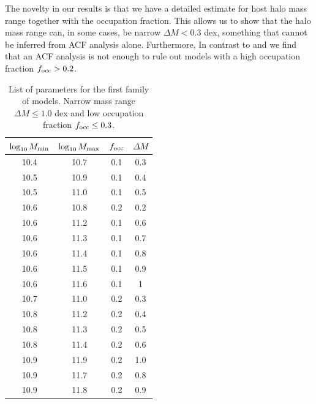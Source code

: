 \documentclass{emulateapj}
\begin{document}
The novelty in our results is that we have a detailed estimate for 
host halo mass range together with the occupation fraction. This allows us
to show that the halo mass range can, in some cases, be narrow $\Delta M <
0.3$ dex, something that cannot be inferred from ACF analysis alone.
Furthermore, In contrast to \cite{Gawiser07} and \cite{Ouchi2010} we
find that an ACF analysis is not enough to rule
out models with a high occupation fraction $f_{\rm occ}>0.2$.




\begin{table}
\begin{center}
\begin{tabular}{cccc}\hline\hline
$\log_{10}M_{\rm min}$ & $\log_{10}M_{\rm max}$ & $f_{\rm occ}$ & $\Delta M$\\\hline
 10.4 &10.7 & 0.1& 0.3 \\
 10.5 &10.9 & 0.1& 0.4 \\
 10.5 &11.0 & 0.1& 0.5 \\
 10.6 &10.8 & 0.2& 0.2 \\
 10.6 &11.2 & 0.1& 0.6 \\
 10.6 &11.3 & 0.1& 0.7 \\
 10.6 &11.4 & 0.1& 0.8 \\
 10.6 &11.5 & 0.1& 0.9 \\
 10.6 &11.6 & 0.1& 1 \\
 10.7 &11.0 & 0.2& 0.3 \\
 10.8 &11.2 & 0.2& 0.4 \\
 10.8 &11.3 & 0.2& 0.5 \\
 10.8 &11.4 & 0.2& 0.6 \\
 10.9 &11.9 & 0.2& 1.0 \\
 10.9 &11.7 & 0.2& 0.8 \\
 10.9 &11.8 & 0.2& 0.9 \\\hline
\end{tabular}
\end{center}
\caption{\label{table:firstfamily}
List of parameters for the first
  family of models. Narrow mass range $\Delta M\leq 1.0$ dex and low
  occupation fraction $f_{\rm occ}\leq 0.3$.} 
\end{table}
\end{document}
